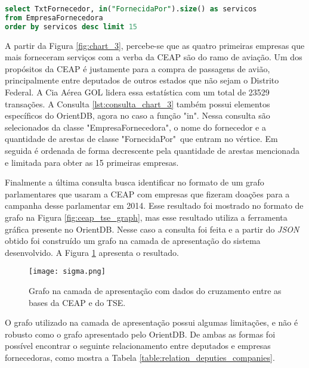 \begin{lstlisting}[label={lst:consulta_chart_3}, caption={Consulta para a Figura \ref{fig:chart_3}},captionpos=b, language=sql]
select TxtFornecedor, in("FornecidaPor").size() as servicos 
from EmpresaFornecedora 
order by servicos desc limit 15
\end{lstlisting}

A partir da Figura \ref{fig:chart_3}, percebe-se que as quatro primeiras empresas que mais forneceram serviços com a verba da CEAP são do ramo de aviação. Um dos propósitos da CEAP é justamente para a compra de passagens de avião, principalmente entre deputados de outros estados que não sejam o Distrito Federal. A Cia Aérea GOL lidera essa estatística com um total de 23529 transações. A Consulta \ref{lst:consulta_chart_3} também possui elementos específicos do OrientDB, agora no caso a função "in". Nessa consulta são selecionados da classe "EmpresaFornecedora", o nome do fornecedor e a quantidade de arestas de classe "FornecidaPor"\ que entram no vértice. Em seguida é ordenada de forma decrescente pela quantidade de arestas mencionada e limitada para obter as 15 primeiras empresas.

Finalmente a última consulta busca identificar no formato de um grafo parlamentares que usaram a CEAP com empresas que fizeram doações para a campanha desse parlamentar em 2014. Esse resultado foi mostrado no formato de grafo na Figura \ref{fig:ceap_tse_graph}, mas esse resultado utiliza a ferramenta gráfica presente no OrientDB. Nesse caso a consulta foi feita e a partir do \textit{JSON} obtido foi construído um grafo na camada de apresentação do sistema desenvolvido. A Figura \ref{fig:sigma} apresenta o resultado.

\begin{figure}[H]
\centering
\texttt{[image: sigma.png]}
\caption{Grafo na camada de apresentação com dados do cruzamento entre as bases da CEAP e do TSE.}
\label{fig:sigma}
\end{figure}

O grafo utilizado na camada de apresentação possui algumas limitações, e não é robusto como o grafo apresentado pelo OrientDB. De ambas as formas foi possível encontrar o seguinte relacionamento entre deputados e empresas fornecedoras, como mostra a Tabela \ref{table:relation_deputies_companies}.

